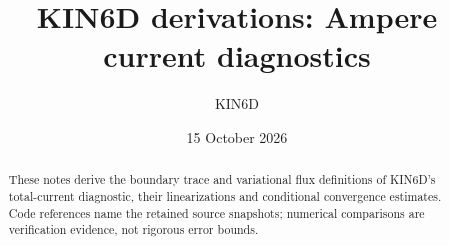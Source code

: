 \documentclass[11pt]{article}
\title{KIN6D derivations: Ampere current diagnostics}
\author{KIN6D}
\date{15 October 2026}
\begin{document}
\maketitle

\begin{abstract}
These notes derive the boundary trace and variational flux definitions of
KIN6D's total-current diagnostic, their linearizations and conditional
convergence estimates. Code references name the retained source snapshots;
numerical comparisons are verification evidence, not rigorous error bounds.
\end{abstract}

\tableofcontents

\end{document}
